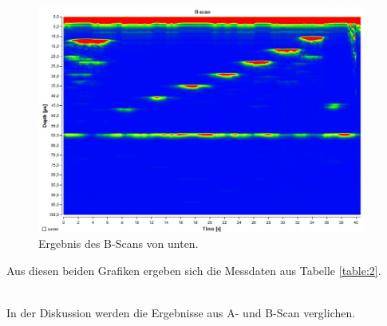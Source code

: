 \begin{figure}[H]
  \centering
  \includegraphics[height=7.5cm]{messdaten/b_unten.png}
  \caption{Ergebnis des B-Scans von unten.}
  \label{figure:2}
\end{figure}

Aus diesen beiden Grafiken ergeben sich die Messdaten aus Tabelle \ref{table:2}.

\\In der Diskussion werden die Ergebnisse aus A- und B-Scan verglichen.








